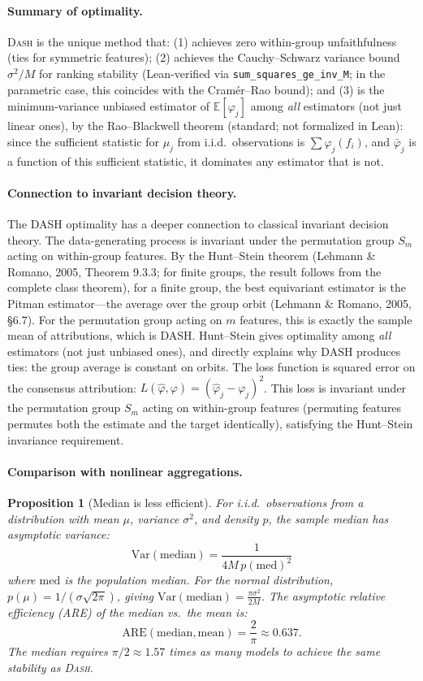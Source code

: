 \documentclass{article}
\newtheorem{proposition}[theorem]{Proposition}
\newcommand{\E}{\mathbb{E}}
\newcommand{\Var}{\mathrm{Var}}
\newcommand{\DASH}{\textsc{Dash}}
\begin{document}
\paragraph{Summary of optimality.}
\DASH{} is the unique method that: (1) achieves zero within-group unfaithfulness (ties for symmetric features); (2) achieves the Cauchy--Schwarz variance bound $\sigma^2/M$ for ranking stability (Lean-verified via \texttt{sum\_squares\_ge\_inv\_M}; in the parametric case, this coincides with the Cram\'er--Rao bound); and (3) is the minimum-variance unbiased estimator of $\E[\varphi_j]$ among \emph{all} estimators (not just linear ones), by the Rao--Blackwell theorem (standard; not formalized in Lean): since the sufficient statistic for $\mu_j$ from i.i.d.\ observations is $\sum \varphi_j(f_i)$, and $\bar\varphi_j$ is a function of this sufficient statistic, it dominates any estimator that is not.

\paragraph{Connection to invariant decision theory.}
The DASH optimality has a deeper connection to classical invariant decision theory. The data-generating process is invariant under the permutation group $S_m$ acting on within-group features. By the Hunt--Stein theorem (Lehmann \& Romano, 2005, Theorem 9.3.3; for finite groups, the result follows from the complete class theorem), for a finite group, the best equivariant estimator is the Pitman estimator---the average over the group orbit (Lehmann \& Romano, 2005, \S 6.7). For the permutation group acting on $m$ features, this is exactly the sample mean of attributions, which is DASH. Hunt--Stein gives optimality among \emph{all} estimators (not just unbiased ones), and directly explains why DASH produces ties: the group average is constant on orbits. The loss function is squared error on the consensus attribution: $L(\hat\varphi, \varphi) = (\hat\varphi_j - \varphi_j)^2$. This loss is invariant under the permutation group $S_m$ acting on within-group features (permuting features permutes both the estimate and the target identically), satisfying the Hunt--Stein invariance requirement.

\paragraph{Comparison with nonlinear aggregations.}

\begin{proposition}[Median is less efficient]
\label{prop:median}
For i.i.d.\ observations from a distribution with mean $\mu$,
variance $\sigma^2$, and density $p$, the sample median has
asymptotic variance:
\[
    \Var(\text{median}) = \frac{1}{4M\, p(\text{med})^2}
\]
where $\text{med}$ is the population median.
For the normal distribution, $p(\mu) = 1/(\sigma\sqrt{2\pi})$,
giving $\Var(\text{median}) = \frac{\pi\sigma^2}{2M}$.
The asymptotic relative efficiency (ARE) of the median vs.\
the mean is:
\[
    \text{ARE}(\text{median}, \text{mean}) = \frac{2}{\pi} \approx 0.637.
\]
The median requires $\pi/2 \approx 1.57$ times as many models to
achieve the same stability as \DASH{}.
\end{proposition}
\end{document}
